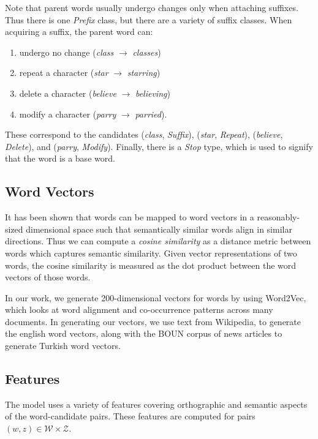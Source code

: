 \documentclass[11pt,twocolumn]{article}
\begin{document}
Note that parent words usually undergo changes only when attaching suffixes. Thus there is one \emph{Prefix} class, but there are a variety of suffix classes. When acquiring a suffix, the parent word can:
\begin{enumerate}
    \item undergo no change (\emph{class} $\rightarrow$ \emph{classes})
    \item repeat a character (\emph{star} $\rightarrow$ \emph{starring})
    \item delete a character (\emph{believe} $\rightarrow$ \emph{believing})
    \item modify a character (\emph{parry} $\rightarrow$ \emph{parried}).
\end{enumerate}
These correspond to the candidates (\emph{class}, \emph{Suffix}), (\emph{star}, \emph{Repeat}), (\emph{believe}, \emph{Delete}), and (\emph{parry}, \emph{Modify}). Finally, there is a \emph{Stop} type, which is used to signify that the word is a base word.

\subsection{Word Vectors}

It has been shown that words can be mapped to word vectors in a reasonably-sized dimensional space such that semantically similar words align in similar directions. Thus we can compute a \emph{cosine similarity} as a distance metric between words which captures semantic similarity. Given vector representations of two words, the cosine similarity is measured as the dot product between the word vectors of those words.

In our work, we generate 200-dimensional vectors for words by using Word2Vec, which looks at word alignment  and co-occurrence patterns across many documents. In generating our vectors, we use text from Wikipedia,
to generate the english word vectors, along with the BOUN corpus of news articles to generate Turkish word vectors.

\subsection{Features}

The model uses a variety of features covering orthographic and semantic aspects of the word-candidate pairs. These features are computed for pairs $(w,z) \in \mathcal W \times \mathcal Z$.
\end{document}

